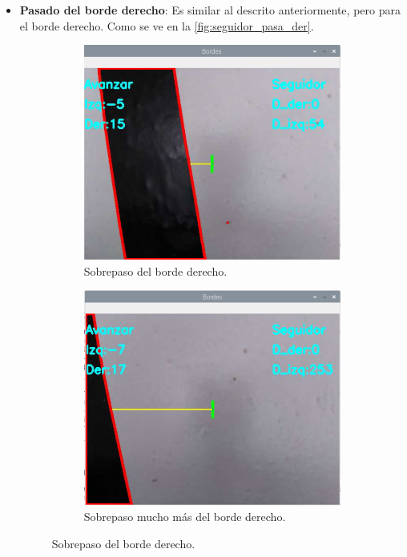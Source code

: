 \documentclass[11pt,a4paper]{article}
\begin{document}
\begin{itemize}
		\item \textbf{Pasado del borde derecho}: Es similar al descrito anteriormente, pero para el borde derecho. Como se ve en la \autoref*{fig:seguidor_pasa_der}.
		
		\begin{figure}[h!]
			\centering
			\begin{subfigure}{0.45\textwidth}
				\includegraphics[width=\textwidth]{imagenes/seguidor_pasado_der1.png}
				\caption{Sobrepaso del borde derecho.}
				\label{subfig:seguidor_pasa_der}
			\end{subfigure}
			\hfill
			\begin{subfigure}{0.45\textwidth}
				\includegraphics[width=\textwidth]{imagenes/seguidor_pasado_der2.png}
				\caption{Sobrepaso mucho más del borde derecho.}
				\label{subfig:seguidor_pasa_der2}
			\end{subfigure}
			\caption{Sobrepaso del borde derecho.}
			\label{fig:seguidor_pasa_der}
		\end{figure}
		

\end{itemize}
\end{document}
